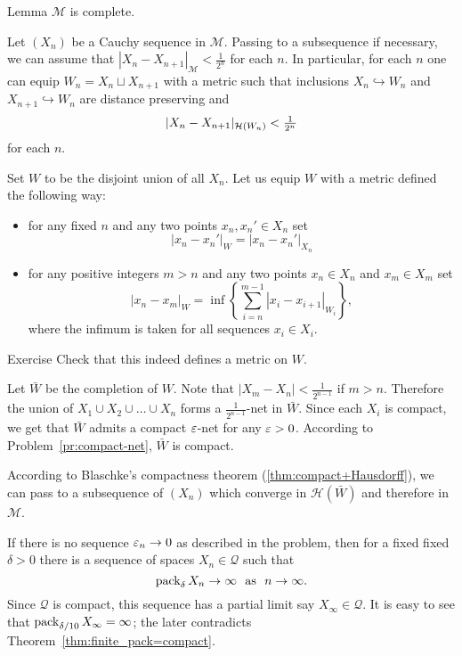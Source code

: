 \begin{thm}{Lemma}
$\mathcal{M}$ is complete.
\end{thm}

Let $(X_n)$ be a Cauchy sequence in $\mathcal{M}$.
Passing to a subsequence if necessary, 
we can assume that $|X_n-X_{n+1}|_{\mathcal{M}}<\tfrac1{2^n}$ for each $n$.
In particular, for each $n$ one can equip $W_n=X_n \sqcup X_{n+1}$ with a metric such that
inclusions $X_n\hookrightarrow W_n$ and $X_{n+1}\hookrightarrow W_n$ are distance preserving
and $$|X_n-X_{n+1}|_{\mathcal{H}(W_n)}\z<\tfrac1{2^n}$$
for each $n$.

Set $W$ to be the disjoint union of all $X_n$.
Let us equip $W$ with a metric defined the following way:
\begin{itemize}
\item for any fixed $n$ and any two points $x_n,x_n'\in X_n$ set
$$|x_n-x_n'|_W=|x_n-x_n'|_{X_n}$$
\item for any positive integers $m>n$ and any two points $x_n\in X_n$ and $x_m\in X_m$ set
$$|x_n-x_m|_W=\inf\left\{\sum_{i=n}^{m-1}|x_i-x_{i+1}|_{W_i}\right\},$$
where the infimum is taken for all sequences $x_i\in X_i$.
\end{itemize}

\begin{thm}{Exercise}
Check that this indeed defines a metric on $W$.
\end{thm}

Let $\bar W$ be the completion of $W$.
Note that $|X_m-X_n|<\tfrac1{2^{n-1}}$ if $m>n$.
Therefore the union of $X_1\cup X_2\cup\dots\cup X_n$ forms a $\tfrac1{2^{n-1}}$-net in $\bar W$.
Since each $X_i$ is compact, we get that $\bar W$ admits a compact $\varepsilon$-net for any $\varepsilon>0$.
According to Problem~\ref{pr:compact-net}, $\bar W$ is compact.

According to Blaschke's compactness theorem (\ref{thm:compact+Hausdorff}),
we can pass to a subsequence of $(X_n)$ which converge in $\mathcal{H}(\bar W)$ and therefore in $\mathcal{M}$.
\qeds

If there is no sequence $\varepsilon_n\to0$ as described in the problem, then for a fixed fixed $\delta>0$
there is a sequence of spaces $X_n\in\mathcal{Q}$ such that $$\pack_\delta X_n\to\infty\ \ \text{as}\ \  n\to\infty.$$
Since $\mathcal{Q}$ is compact, 
this sequence has a partial limit say $X_\infty\in\mathcal{Q}$.
It is easy to see that $\operatorname{pack}_{\delta/10} X_\infty=\infty$;
the later contradicts Theorem~\ref{thm:finite_pack=compact}.

